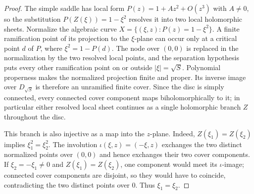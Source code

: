 \documentclass[11pt]{article}
\begin{document}
\begin{proof}
The simple saddle has local form $P(z)=1+Az^2+O(z^3)$ with $A\ne0$, so the
substitution $P(Z(\xi))=1-\xi^2$ resolves it into two local holomorphic
sheets.  Normalize the algebraic curve
$X=\{(\xi,z):P(z)=1-\xi^2\}$.  A finite ramification point of its projection
to the $\xi$-plane can occur only at a critical point $d$ of $P$, where
$\xi^2=1-P(d)$.  The node over $(0,0)$ is replaced in the normalization by
the two resolved local points, and the separation hypothesis puts every
other ramification point on or outside $|\xi|=\sqrt S$.  Polynomial
properness makes the normalized projection finite and proper.  Its inverse
image over $D_{\sqrt S}$ is therefore an unramified finite cover.  Since the
disc is simply connected, every connected cover component maps
biholomorphically to it; in particular either resolved local sheet continues
as a single holomorphic branch $Z$ throughout the disc.

This branch is also injective as a map into the $z$-plane.  Indeed,
$Z(\xi_1)=Z(\xi_2)$ implies $\xi_1^2=\xi_2^2$.  The involution
$\iota(\xi,z)=(-\xi,z)$ exchanges the two distinct normalized points over
$(0,0)$ and hence exchanges their two cover components.  If
$\xi_2=-\xi_1\ne0$ and $Z(\xi_1)=Z(\xi_2)$, one component would meet its
$\iota$-image; connected cover components are disjoint, so they would have to
coincide, contradicting the two distinct points over $0$.  Thus
$\xi_1=\xi_2$.


\end{proof}
\end{document}
